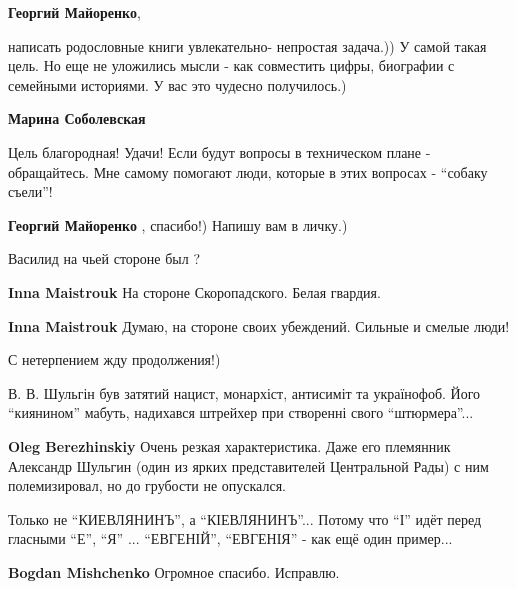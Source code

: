 \begin{itemize}
\begin{itemize}
\begin{itemize} %
\textbf{Георгий Майоренко}, 

написать родословные книги увлекательно- непростая задача.)) У самой такая
цель. Но еще не уложились мысли - как совместить цифры, биографии с семейными
историями. У вас это чудесно получилось.)

\textbf{Марина Соболевская} 

Цель благородная! Удачи! Если будут вопросы в техническом плане - обращайтесь.
Мне самому помогают люди, которые в этих вопросах - \enquote{собаку съели}!

\textbf{Георгий Майоренко} , спасибо!) Напишу вам в личку.)
\end{itemize} %

\end{itemize} %

Василид на чьей стороне был ?

\begin{itemize} %
\textbf{Inna Maistrouk} На стороне Скоропадского. Белая гвардия.

\textbf{Inna Maistrouk} Думаю, на стороне своих убеждений. Сильные и смелые люди!
\end{itemize} %

С нетерпением жду продолжения!)


В. В. Шульгін був затятий нацист, монархіст, антисиміт та українофоб. Його
\enquote{киянином} мабуть, надихався штрейхер при створенні свого \enquote{штюрмера}...

\begin{itemize} %
\textbf{Oleg Berezhinskiy} Очень резкая характеристика. Даже его племянник Александр Шульгин (один из ярких представителей Центральной Рады) с ним полемизировал, но до грубости не опускался.
\end{itemize} %


Только не \enquote{КИЕВЛЯНИНЪ}, а \enquote{КІЕВЛЯНИНЪ}... Потому что
\enquote{І} идёт перед гласными \enquote{Е}, \enquote{Я} ... \enquote{ЕВГЕНІЙ},
\enquote{ЕВГЕНІЯ} - как ещё один пример...

\begin{itemize} %
\textbf{Bogdan Mishchenko} Огромное спасибо. Исправлю.
\end{itemize} %


\end{itemize}
